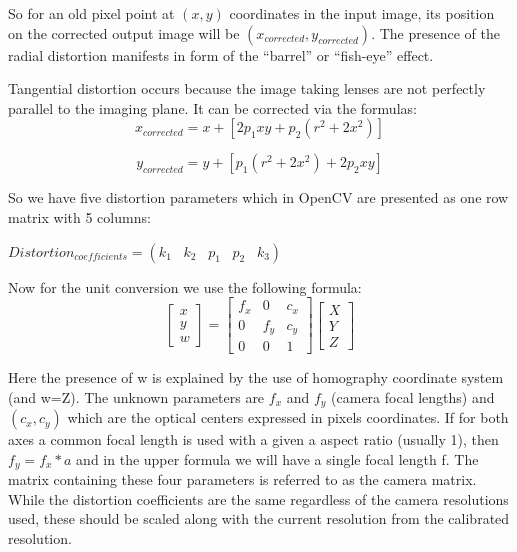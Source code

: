 \documentclass[11pt]{report}
\begin{document}
So for an old pixel point at ${(x,y)}$ coordinates in the input image, its position on the corrected output image will be ${(x_{corrected}, y_{corrected})}$. The presence of the radial distortion manifests in form of the “barrel” or “fish-eye” effect.

Tangential distortion occurs because the image taking lenses are not perfectly parallel to the imaging plane. It can be corrected via the formulas:
\begin{equation}
x_{corrected} = x + [2p_{1}xy + p_{2}(r^{2} + 2x^{2})] 
\end{equation}

\begin{equation}
y_{corrected} = y + [p_{1}(r^{2} + 2x^{2}) + 2p_{2}xy] 
\end{equation}

So we have five distortion parameters which in OpenCV are presented as one row matrix with 5 columns:

$Distortion_{coefficients}=(k_1 \hspace{10pt} k_2 \hspace{10pt} p_1 \hspace{10pt} p_2 \hspace{10pt} k_3)$

Now for the unit conversion we use the following formula:
\begin{equation}
\begin{bmatrix}
x \\ y \\w
\end{bmatrix}=
\begin{bmatrix}
f_x & 0 & c_x\\
0 & f_y & c_y\\
0 & 0 & 1
\end{bmatrix}
\begin{bmatrix}
X \\ Y \\ Z
\end{bmatrix}
\end{equation}


Here the presence of w is explained by the use of homography coordinate system (and w=Z). The unknown parameters are $f_x$ and $f_y$ (camera focal lengths) and $(c_x, c_y)$ which are the optical centers expressed in pixels coordinates. If for both axes a common focal length is used with a given a aspect ratio (usually 1), then $f_y=f_x*a$ and in the upper formula we will have a single focal length f. The matrix containing these four parameters is referred to as the camera matrix. While the distortion coefficients are the same regardless of the camera resolutions used, these should be scaled along with the current resolution from the calibrated resolution.
\end{document}

